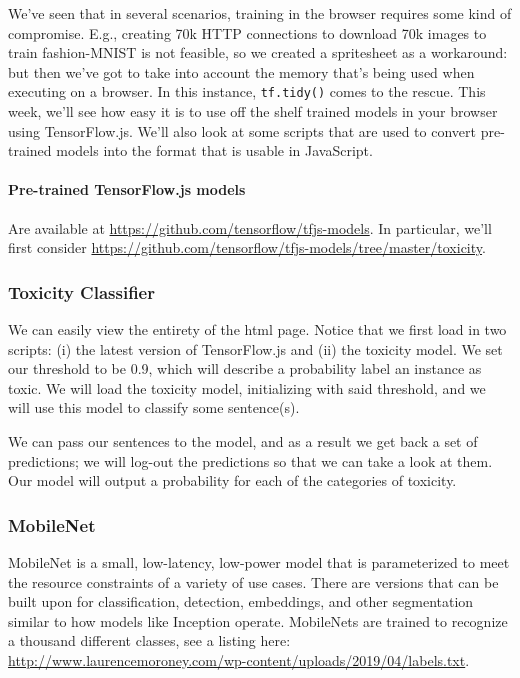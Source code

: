 \documentclass[12pt]{article}
\begin{document}
We've seen that in several scenarios, training in the browser requires some kind of compromise. E.g., creating 70k HTTP connections to download 70k images to train fashion-MNIST is not feasible, so we created a spritesheet as a workaround: but then we've got to take into account the memory that's being used when executing on a browser. In this instance, \texttt{tf.tidy()} comes to the rescue. This week, we'll see how easy it is to use off the shelf trained models in your browser using TensorFlow.js. We'll also look at some scripts that are used to convert pre-trained models into the format that is usable in JavaScript.

\paragraph{Pre-trained TensorFlow.js models} Are available at \url{https://github.com/tensorflow/tfjs-models}. In particular, we'll first consider \url{https://github.com/tensorflow/tfjs-models/tree/master/toxicity}.

\subsubsection{Toxicity Classifier} We can easily view the entirety of the html page. Notice that we first load in two scripts: (i) the latest version of TensorFlow.js and (ii) the toxicity model. We set our threshold to be 0.9, which will describe a probability label an instance as toxic. We will load the toxicity model, initializing with said threshold, and we will use this model to classify some sentence(s).

We can pass our sentences to the model, and as a result we get back a set of predictions; we will log-out the predictions so that we can take a look at them. Our model will output a probability for each of the categories of toxicity.

\subsubsection{MobileNet} MobileNet is a small, low-latency, low-power model that is parameterized to meet the resource constraints of a variety of use cases. There are versions that can be built upon for classification, detection, embeddings, and other segmentation similar to how models like Inception operate. MobileNets are trained to recognize a thousand different classes, see a listing here:
\url{http://www.laurencemoroney.com/wp-content/uploads/2019/04/labels.txt}.
\end{document}
